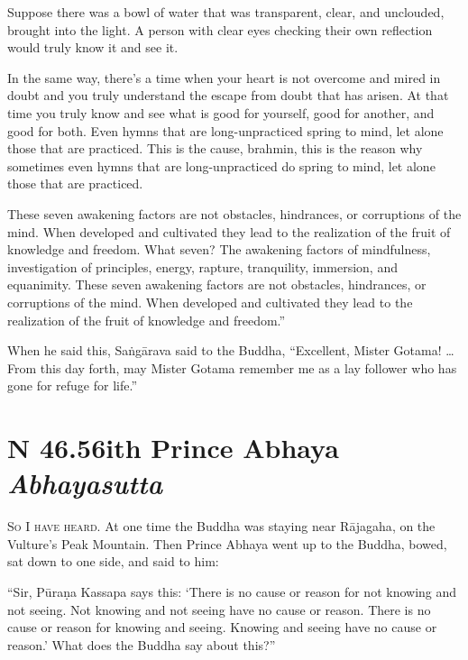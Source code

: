 \documentclass[12pt,openany]{book}%
\newcommand*{\suttatitleacronym}[1]{\smaller[2]{#1}\vspace*{.3em}}
\newcommand*{\suttatitletranslation}[1]{\linebreak{#1}}
\newcommand*{\suttatitleroot}[1]{\linebreak\smaller[2]\itshape{#1}}
\newcommand*{\tocacronym}[1]{\hspace*{-3.3em}{#1}\quad}
\newcommand*{\toctranslation}[1]{#1}
\newcommand*{\tocroot}[1]{(\textit{#1})}
\newcommand*{\scevam}[1]{\textsc{#1}}
\begin{document}
Suppose there was a bowl of water that was transparent, clear, and unclouded, brought into the light. A person with clear eyes checking their own reflection would truly know it and see it. 

In the same way, there’s a time when your heart is not overcome and mired in doubt and you truly understand the escape from doubt that has arisen. At that time you truly know and see what is good for yourself, good for another, and good for both. Even hymns that are long-unpracticed spring to mind, let alone those that are practiced. This is the cause, brahmin, this is the reason why sometimes even hymns that are long-unpracticed do spring to mind, let alone those that are practiced. 

These seven awakening factors are not obstacles, hindrances, or corruptions of the mind. When developed and cultivated they lead to the realization of the fruit of knowledge and freedom. What seven? The awakening factors of mindfulness, investigation of principles, energy, rapture, tranquility, immersion, and equanimity. These seven awakening factors are not obstacles, hindrances, or corruptions of the mind. When developed and cultivated they lead to the realization of the fruit of knowledge and freedom.” 

When he said this, \textsanskrit{Saṅgārava} said to the Buddha, “Excellent, Mister Gotama! … From this day forth, may Mister Gotama remember me as a lay follower who has gone for refuge for life.” 

%
\section*{{\suttatitleacronym SN 46.56}{\suttatitletranslation With Prince Abhaya }{\suttatitleroot Abhayasutta}}
\addcontentsline{toc}{section}{\tocacronym{SN 46.56} \toctranslation{With Prince Abhaya } \tocroot{Abhayasutta}}

\scevam{So I have heard. }At one time the Buddha was staying near \textsanskrit{Rājagaha}, on the Vulture’s Peak Mountain. Then Prince Abhaya went up to the Buddha, bowed, sat down to one side, and said to him: 

“Sir, \textsanskrit{Pūraṇa} Kassapa says this: ‘There is no cause or reason for not knowing and not seeing. Not knowing and not seeing have no cause or reason. There is no cause or reason for knowing and seeing. Knowing and seeing have no cause or reason.’ What does the Buddha say about this?” 
\end{document}
